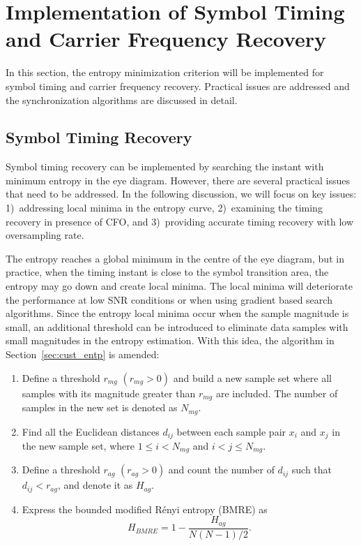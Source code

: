 \documentclass[journal,comsoc,onecolumn, 12pt,draftclsnofoot]{IEEEtran}
\begin{document}
\section{Implementation of Symbol Timing and Carrier Frequency Recovery}
\label{sec:imple}
In this section, the entropy minimization criterion will be implemented for symbol timing and carrier frequency recovery.
Practical issues are addressed and the
synchronization algorithms are discussed in detail. 

\subsection{Symbol Timing Recovery} 
\label{sec:timing}
Symbol timing recovery can be implemented by searching the instant with minimum entropy in the eye diagram.
However, there are several practical issues that need to be addressed.
In the following discussion, we will focus on key issues: 
1)~addressing local minima in the entropy curve,  
2)~examining the timing recovery in presence of CFO, and 
3)~providing accurate timing recovery with low oversampling rate.

The entropy reaches a global minimum in the centre of the eye diagram, but in practice, when the timing instant is close to the symbol transition area, the entropy may go down and create local minima. 
The local minima will deteriorate the performance at low SNR conditions or when using gradient based search algorithms.
Since the entropy local minima occur when the sample magnitude is small, an additional threshold can be introduced to eliminate data samples with small magnitudes in the entropy estimation.
With this idea, the algorithm in Section~\ref{sec:cust_entp} is amended:

\begin{enumerate}
\item Define a threshold \(r_{mg}\) \((r_{mg}>0)\) and build a new sample set where all samples with its magnitude greater than \(r_{mg}\) are included.
The number of samples in the new set is denoted as \(N_{mg}\).
\item Find all the Euclidean distances \(d_{ij}\) between each sample pair \(x_i\) and \(x_j\) in the new sample set, where \(1\le i<N_{mg}\) and \( i<j \le N_{mg}\). 
\item Define a threshold \(r_{ag}\) \((r_{ag}>0)\) and count the number of \(d_{ij}\) such that $d_{ij}<r_{ag}$, and denote it as $H_{ag}$.
\item Express the bounded modified R\'enyi entropy (BMRE) as
\begin{equation}
H_{BMRE}= 1- \frac{ H_{ag}}{ N(N-1)/2}.
\label{eq:entorpy_ad2}
\end{equation}
\end{enumerate}
\end{document}
